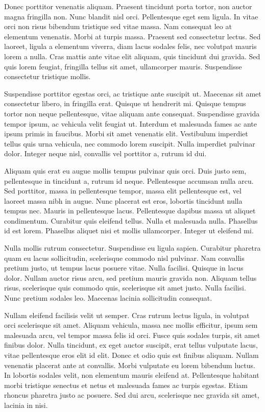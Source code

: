 Donec porttitor venenatis aliquam. Praesent tincidunt porta tortor, non auctor magna fringilla non. Nunc blandit nisl orci. Pellentesque eget sem ligula. In vitae orci non risus bibendum tristique sed vitae massa. Nam consequat leo at elementum venenatis. Morbi at turpis massa. Praesent sed consectetur lectus. Sed laoreet, ligula a elementum viverra, diam lacus sodales felis, nec volutpat mauris lorem a nulla. Cras mattis ante vitae elit aliquam, quis tincidunt dui gravida. Sed quis lorem feugiat, fringilla tellus sit amet, ullamcorper mauris. Suspendisse consectetur tristique mollis.

Suspendisse porttitor egestas orci, ac tristique ante suscipit ut. Maecenas sit amet consectetur libero, in fringilla erat. Quisque ut hendrerit mi. Quisque tempus tortor non neque pellentesque, vitae aliquam ante consequat. Suspendisse gravida tempor ipsum, ac vehicula velit feugiat ut. Interdum et malesuada fames ac ante ipsum primis in faucibus. Morbi sit amet venenatis elit. Vestibulum imperdiet tellus quis urna vehicula, nec commodo lorem suscipit. Nulla imperdiet pulvinar dolor. Integer neque nisl, convallis vel porttitor a, rutrum id dui.

Aliquam quis erat eu augue mollis tempus pulvinar quis orci. Duis justo sem, pellentesque in tincidunt a, rutrum id neque. Pellentesque accumsan nulla arcu. Sed porttitor, massa in pellentesque tempor, massa elit pellentesque est, vel laoreet massa nibh in augue. Nunc placerat est eros, lobortis tincidunt nulla tempus nec. Mauris in pellentesque lacus. Pellentesque dapibus massa ut aliquet condimentum. Curabitur quis eleifend tellus. Nulla et malesuada nulla. Phasellus id est lorem. Phasellus aliquet nisi et mollis ullamcorper. Integer ut eleifend mi.

Nulla mollis rutrum consectetur. Suspendisse eu ligula sapien. Curabitur pharetra quam eu lacus sollicitudin, scelerisque commodo nisl pulvinar. Nam convallis pretium justo, ut tempus lacus posuere vitae. Nulla facilisi. Quisque in lacus dolor. Nullam auctor risus arcu, sed pretium mauris gravida non. Aliquam tellus risus, scelerisque quis commodo quis, scelerisque sit amet justo. Nulla facilisi. Nunc pretium sodales leo. Maecenas lacinia sollicitudin consequat.

Nullam eleifend facilisis velit ut semper. Cras rutrum lectus ligula, in volutpat orci scelerisque sit amet. Aliquam vehicula, massa nec mollis efficitur, ipsum sem malesuada arcu, vel tempor massa felis id orci. Fusce quis sodales turpis, sit amet finibus dolor. Nulla tincidunt, ex eget auctor suscipit, erat tellus vulputate lacus, vitae pellentesque eros elit id elit. Donec et odio quis est finibus aliquam. Nullam venenatis placerat ante at convallis. Morbi vulputate eu lorem bibendum luctus. In lobortis sodales velit, non elementum mauris eleifend at. Pellentesque habitant morbi tristique senectus et netus et malesuada fames ac turpis egestas. Etiam rhoncus pharetra justo ac posuere. Sed dui arcu, scelerisque nec gravida sit amet, lacinia in nisi.


